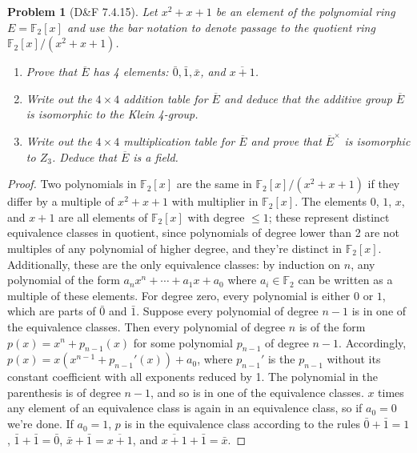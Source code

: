 \documentclass{article}
\newtheorem{plm}{Problem}
\begin{document}
\begin{plm}[D\&F 7.4.15]
  Let $x^{2} + x + 1$ be an element of the polynomial ring $E = \mathbb{F}_{2}[x]$
  and use the bar notation to denote passage to the quotient ring $\mathbb{F}_{2}[x] / (x^{2} + x + 1)$.
  \begin{enumerate}
  \item Prove that $\overline{E}$ has 4 elements: $\bar{0}, \bar{1}, \bar{x}$, and $\overline{x + 1}$.
  \item Write out the $4 \times 4$ addition table for $\overline{E}$ and deduce that the additive group $\overline{E}$ is isomorphic to the Klein 4-group.
  \item Write out the $4 \times 4$ multiplication table for $\overline{E}$ and prove that $\overline{E}^{\times}$ is isomorphic to $Z_{3}$.
    Deduce that $\overline{E}$ is a field.
  \end{enumerate}
\end{plm}

\begin{proof}
  Two polynomials in $\mathbb{F}_{2}[x]$ are the same in $\mathbb{F}_{2}[x] / (x^{2} + x + 1)$ if they differ by a multiple of $x^{2} + x + 1$
  with multiplier in $\mathbb{F}_{2}[x]$.
  The elements $0$, $1$, $x$, and $x + 1$ are all elements of $\mathbb{F}_{2}[x]$ with degree $\leq 1$;
  these represent distinct equivalence classes in quotient, since polynomials of degree lower than 2 are not multiples of any polynomial of higher degree,
  and they're distinct in $\mathbb{F}_{2}[x]$.
  Additionally, these are the only equivalence classes: by induction on $n$, any polynomial of the form
  $a_{n}x^{n} + \cdots + a_{1}x + a_{0}$ where $a_{i} \in \mathbb{F}_{2}$ can be written as a multiple of these elements.
  For degree zero, every polynomial is either $0$ or $1$, which are parts of $\bar{0}$ and $\bar{1}$.
  Suppose every polynomial of degree $n-1$ is in one of the equivalence classes.
  Then every polynomial of degree $n$ is of the form $p(x) = x^{n} + p_{n-1}(x)$ for some polynomial $p_{n-1}$ of degree $n-1$.
  Accordingly, $p(x) =  x(x^{n - 1} + p_{n-1}'(x)) + a_0$, where $p_{n-1}'$ is the $p_{n-1}$ without its constant coefficient with all exponents reduced by 1.
  The polynomial in the parenthesis is of degree $n-1$, and so is in one of the equivalence classes.
  $x$ times any element of an equivalence class is again in an equivalence class, so if $a_{0} = 0$ we're done.
  If $a_{0} = 1$, $p$ is in the equivalence class according to the rules $\bar{0} + \bar{1} = 1$, $\bar{1} + \bar{1} = \bar{0}$,
  $\bar{x} + \bar{1} = \overline{x + 1}$, and $\overline{x+1} + \bar{1} = \bar{x}$.
\end{proof}
\end{document}
